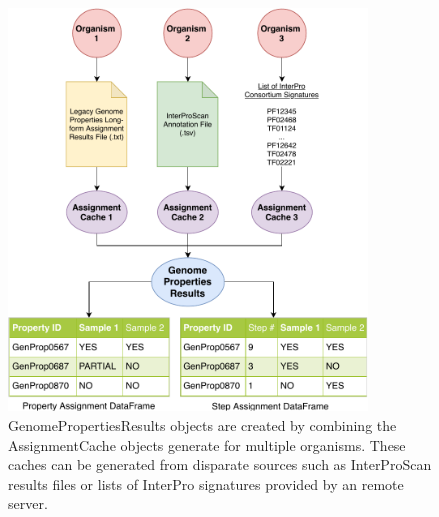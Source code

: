 \begin{figure}[!ht]
  \centering
	\includegraphics[width=0.85\textwidth]{media/assignment_results_overview.pdf}
	 \caption{GenomePropertiesResults objects are created by combining the AssignmentCache objects generate for multiple organisms. These caches can be generated from disparate sources such as InterProScan results files or lists of InterPro signatures provided by an remote server.}
	 \label{fig:resultscreation}
\end{figure}


